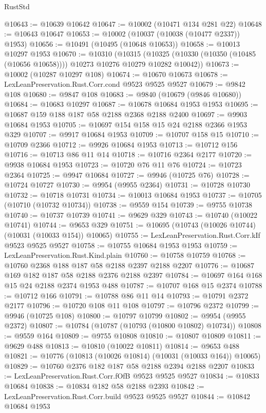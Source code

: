 \begin{lexlean}{RustStd}
\begin{coremodule}
@10643 := @10639 @10642
@10647 := @10002 (@10471 @134 @281 @22)
@10648 := @10643 @10647
@10653 := @10002 (@10037 (@10038 (@10477 @2337)) @1953)
@10656 := @10491 (@10495 (@10648 @10653))
@10658 := @10013 @10297 @1953
@10670 := @10310
    (@10315 (@10325 (@10330 (@10350 (@10485 (@10656 @10658)))) @10273 @10276 @10279 @10282 @10042))
@10673 := @10002 (@10287 @10297 @108)
@10674 := @10670 @10673
@10678 := LexLeanPreservation.Rust.Corr.cond @9523 @9525 @9527
@10679 := @9842 @108
@10680 := @9847 @108
@10683 := @9840 (@10679 (@9846 @10680))
@10684 := @10683 @10297
@10687 := @10678 @10684 @1953 @1953
@10695 := @10687 @159 @188 @187 @58 @2188 @2368 @2188 @2400
@10697 := @9903 @10684 @1953
@10705 := @10697 @154 @158 @15 @24 @2188 @2366 @1953 @329
@10707 := @9917 @10684 @1953
@10709 := @10707 @158 @15
@10710 := @10709 @2366
@10712 := @9926 @10684 @1953
@10713 := @10712 @156
@10716 := @10713 @86 @11 @14
@10718 := @10716 @2364 @2177
@10720 := @9938 @10684 @1953
@10723 := @10720 @76 @11 @76
@10724 := @10723 @2364
@10725 := @9947 @10684
@10727 := @9946 (@10725 @76)
@10728 := @10724 @10727
@10730 := @9954 (@9955 @2364)
@10731 := @10728 @10730
@10732 := @10718 @10731
@10734 := @10013 @10684 @1953
@10737 := @10705 (@10710 (@10732 @10734))
@10738 := @9559 @154
@10739 := @9755 @10738
@10740 := @10737 @10739
@10741 := @9629 @329
@10743 := @10740 (@10022 @10741)
@10744 := @9653 @329
@10751 := @10695 (@10743 (@10026 @10744) (@10031 (@10033 @154)) @10065)
@10755 := LexLeanPreservation.Rust.Corr.kIf @9523 @9525 @9527
@10758 := @10755 @10684 @1953 @1953
@10759 := LexLeanPreservation.Rust.Kind.plain
@10760 := @10758 @10759
@10768 := @10760 @2368 @188 @187 @58 @2188 @2397 @2188 @2207
@10776 := @10687 @169 @182 @187 @58 @2188 @2376 @2188 @2397
@10784 := @10697 @164 @168 @15 @24 @2188 @2374 @1953 @488
@10787 := @10707 @168 @15 @2374
@10788 := @10712 @166
@10791 := @10788 @86 @11 @14
@10793 := @10791 @2372 @2177
@10796 := @10720 @108 @11 @108
@10797 := @10796 @2372
@10799 := @9946 (@10725 @108)
@10800 := @10797 @10799
@10802 := @9954 (@9955 @2372)
@10807 := @10784 (@10787 (@10793 (@10800 @10802) @10734))
@10808 := @9559 @164
@10809 := @9755 @10808
@10810 := @10807 @10809
@10811 := @9629 @488
@10813 := @10810 (@10022 @10811)
@10814 := @9653 @488
@10821 := @10776 (@10813 (@10026 @10814) (@10031 (@10033 @164)) @10065)
@10829 := @10760 @2376 @182 @187 @58 @2188 @2394 @2188 @2207
@10833 := LexLeanPreservation.Rust.Corr.fOfB @9523 @9525 @9527
@10834 := @10833 @10684
@10838 := @10834 @182 @58 @2188 @2393
@10842 := LexLeanPreservation.Rust.Corr.build @9523 @9525 @9527
@10844 := @10842 @10684 @1953

\end{coremodule}
\end{lexlean}
